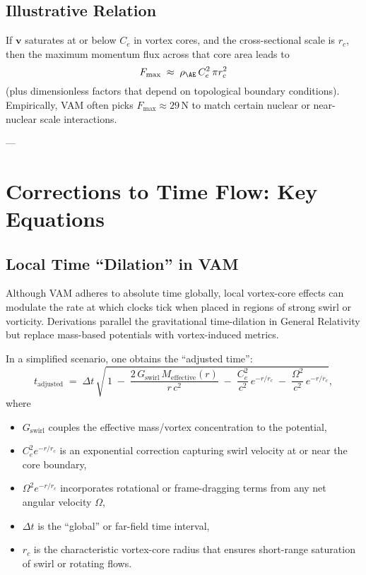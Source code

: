 \subsection{Illustrative Relation}
If \(\mathbf{v}\) saturates at or below \(C_e\) in vortex cores, and the cross-sectional scale is \(r_c\), then the maximum momentum flux across that core area leads to
\[
    F_{\max}
    \;\approx\;
    \rho_{\mathrm{\AE}}\, C_e^2\, \pi r_c^2
\]
(plus dimensionless factors that depend on topological boundary conditions). Empirically, VAM often picks \(F_{\max}\approx 29\,\mathrm{N}\) to match certain nuclear or near-nuclear scale interactions.

---

\section{Corrections to Time Flow: Key Equations}

\subsection{Local Time “Dilation” in VAM}
Although VAM adheres to absolute time globally, local vortex-core effects can modulate the rate at which clocks tick when placed in regions of strong swirl or vorticity. Derivations parallel the gravitational time-dilation in General Relativity but replace mass-based potentials with vortex-induced metrics.

In a simplified scenario, one obtains the “adjusted time”:
\[
    t_{\text{adjusted}}
    \;=\;
    \Delta t \,\sqrt{\,1 \;-\; \frac{2\,G_{\text{swirl}}\,M_{\text{effective}}(r)}{r\,c^2}
    \;-\;
    \frac{C_e^2}{c^2} \, e^{-r/r_c}
        \;-\;
        \frac{\Omega^2}{c^2} \, e^{-r/r_c}
    },
\]
where
\begin{itemize}
    \item \(G_{\text{swirl}}\) couples the effective mass/vortex concentration to the potential,
    \item \(C_e^2 e^{-r/r_c}\) is an exponential correction capturing swirl velocity at or near the core boundary,
    \item \(\Omega^2 e^{-r/r_c}\) incorporates rotational or frame-dragging terms from any net angular velocity \(\Omega\),
    \item \(\Delta t\) is the “global” or far-field time interval,
    \item \(r_c\) is the characteristic vortex-core radius that ensures short-range saturation of swirl or rotating flows.
\end{itemize}

